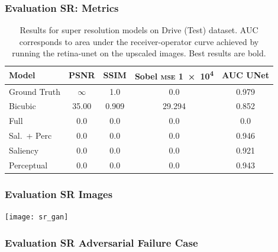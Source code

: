 \documentclass{beamer}
\begin{document}
\begin{frame} \frametitle{Evaluation SR: Metrics}
 \begin{table}[]
\centering
\caption{Results for super resolution models on Drive (Test) dataset.
  AUC corresponds to area under the receiver-operator curve achieved by running the retina-unet on the upscaled images.
  Best results are bold.
}

\label{tab:results-sr}
\begin{tabular}{@{}lS[table-format=2.3]S[table-format=2.3]S[table-format=2.3]S[table-format=2.3]@{}}
\toprule
{Model} & {PSNR} & {SSIM} & {Sobel \textsc{mse} \SI{1e4}{}} & {AUC UNet} \\ \midrule
Ground Truth & $\infty$ & 1.0 & 0.0 & 0.979 \\
Bicubic & 35.00 & 0.909 & 29.294 &  0.852 \\
Full & 0.0 & 0.0 & 0.0 & 0.0 \\
Sal.\ + Perc\  & 0.0 & 0.0 & 0.0 & 0.946 \\
Saliency & 0.0 & 0.0 & 0.0 & 0.921 \\
Perceptual & 0.0 & 0.0 & 0.0 & 0.943 \\
\bottomrule
\end{tabular}
\end{table}

\end{frame}

\begin{frame} \frametitle{Evaluation SR Images}
  \centering
 \texttt{[image: sr\_gan]}
\end{frame}

\begin{frame} \frametitle{Evaluation SR Adversarial Failure Case}
  
\end{frame}
\end{document}
